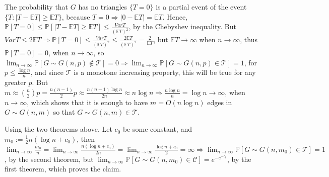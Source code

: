 \documentclass{article}
\begin{document}
\begin{enumerate}
The probability that $G$ has no triangles $\{T=0\}$ is a partial event of the event $\{T : |T-\mathbb{E}T|\geq\mathbb{E}T\}$, because $T=0\Rightarrow|0-\mathbb{E}T|=\mathbb{E}T$. Hence, $\mathbb{P}[T=0]\leq\mathbb{P}[|T-\mathbb{E}T|\geq\mathbb{E}T]\leq\frac{VarT}{(\mathbb{E}T)^2}$, by the Chebyshev inequality. But $VarT\leq{2\mathbb{E}T}\Rightarrow\mathbb{P}[T=0]\leq\frac{VarT}{(\mathbb{E}T)^2}\leq\frac{2\mathbb{E}T}{(\mathbb{E}T)^2}=\frac{2}{\mathbb{E}T}$, but $\mathbb{E}T\rightarrow\infty$ when $n\rightarrow\infty$, thus $\mathbb{P}[T=0]=0$, when $n\rightarrow\infty$, so $\lim_{n\rightarrow\infty}\mathbb{P}[G\sim{G(n,p)}\notin\mathcal{T}]=0\Rightarrow\lim_{n\rightarrow\infty}\mathbb{P}[G\sim{G(n,p)}\in\mathcal{T}]=1$, for $p\leq\frac{\log{n}}{n}$, and since $\mathcal{T}$ is a monotone increasing property, this will be true for any greater $p$. But $m\approx\binom{n}{2}p=\frac{n(n-1)}{2}p\approx\frac{n(n-1)\log{n}}{2n}\approx{n\log{n}}\Rightarrow\frac{n\log{n}}{n}=\log{n}\rightarrow\infty$, when $n\rightarrow\infty$, which shows that it is enough to have $m=O(n\log{n})$ edges in $G\sim{G(n,m)}$ so that $G\sim{G(n,m)}\in\mathcal{T}$.
\end{enumerate}
    
    Using the two theorems above. Let $c_0$ be some constant, and $m_0:=\frac{1}{2}n(\log{n}+c_0)$, then $\lim_{n\rightarrow\infty}\frac{m_0}{n}=\lim_{n\rightarrow\infty}\frac{n(\log{n}+c_0)}{2n}=\lim_{n\rightarrow\infty}\frac{\log{n}+c_0}{2}=\infty\Rightarrow{\lim_{n\rightarrow\infty}\mathbb{P}[G\sim{G(n,m_0)}\in\mathcal{T}]}=1$, by the second theorem, but $\lim_{n\rightarrow\infty}\mathbb{P}[G\sim{G(n,m_0)}\in\mathcal{C}]=e^{-e^{-c_0}}$, by the first theorem, which proves the claim.
\end{document}
